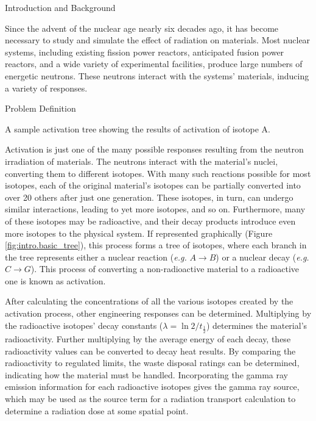 
\begin{chapter}{Introduction and Background}
  
  Since the advent of the nuclear age nearly six decades ago, it has
  become necessary to study and simulate the effect of radiation on
  materials.  Most nuclear systems, including existing fission power
  reactors, anticipated fusion power reactors, and a wide variety of
  experimental facilities, produce large numbers of energetic
  neutrons.  These neutrons interact with the systems' materials,
  inducing a variety of responses.

  \begin{section}{Problem Definition\label{sec:intro.prob_def}}
    
    \begin{floatingfigure}{0.55\columnwidth}
      \begin{center}
        \caption{A sample activation tree showing the results of
          activation of isotope A.}\label{fig:intro.basic_tree}
      \end{center}
    \end{floatingfigure}
    
    \noindent Activation is just one of the many possible responses resulting
    from the neutron irradiation of materials.  The neutrons interact
    with the material's nuclei, converting them to different isotopes.
    With many such reactions possible for most isotopes, each of the
    original material's isotopes can be partially converted into over
    20 others after just one generation.  These isotopes, in turn, can
    undergo similar interactions, leading to yet more isotopes, and so
    on.  Furthermore, many of these isotopes may be radioactive, and
    their decay products introduce even more isotopes to the physical
    system.  If represented graphically (Figure
    \ref{fig:intro.basic_tree}), this process forms a tree of
    isotopes, where each branch in the tree represents either a
    nuclear reaction (\textsl{e.g.} $A \rightarrow B$) or a nuclear
    decay (\textsl{e.g.} $C \rightarrow G$).  This process of
    converting a non-radioactive material to a radioactive one is
    known as activation.
    
    After calculating the concentrations of all the various isotopes
    created by the activation process, other engineering responses can
    be determined.  Multiplying by the radioactive isotopes' decay
    constants ($\lambda = \ln 2/t_{\frac{1}{2}}$) determines the
    material's radioactivity.  Further multiplying by the average
    energy of each decay, these radioactivity values can be converted
    to decay heat results.  By comparing the radioactivity to
    regulated limits, the waste disposal ratings can be determined,
    indicating how the material must be handled.  Incorporating the
    gamma ray emission information for each radioactive isotopes gives
    the gamma ray source, which may be used as the source term for a
    radiation transport calculation to determine a radiation dose at
    some spatial point.
    

\end{section}
\end{chapter}
